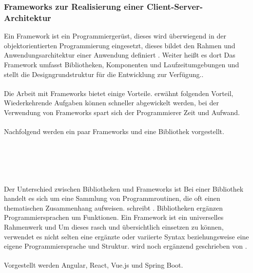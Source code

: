 \subsubsection{Frameworks zur Realisierung einer Client-Server-Architektur}\label{frameworks zur Realisierung einer Client-Server-Architektur}

Ein Framework ist ein Programmiergerüst, dieses wird überwiegend in der objektorientierten Programmierung eingesetzt, dieses bildet den Rahmen und Anwendungsarchitektur einer Anwendung definiert \cite{Framework1}. Weiter heißt es dort \glqq Das Framework umfasst Bibliotheken, Komponenten und Laufzeitumgebungen und stellt die Designgrundstruktur für die Entwicklung zur Verfügung.\grqq{}.
\\
\\
Die Arbeit mit Frameworks bietet einige Vorteile. \cite{Framework2} erwähnt folgenden Vorteil, \glqq Wiederkehrende Aufgaben können schneller abgewickelt werden,\grqq{} bei der Verwendung von Frameworks spart sich der Programmierer Zeit und Aufwand.
\\
\\
Nachfolgend werden ein paar Frameworks und eine Bibliothek vorgestellt. 
\\
\\
\\
\\
\\
\\
Der Unterschied zwischen Bibliotheken und Frameworks ist \glqq Bei einer Bibliothek handelt es sich um eine Sammlung von Programmroutinen, die oft einen thematischen Zusammenhang aufweisen.\grqq{} schreibt \cite{AngularReactVergleich12}. Bibliotheken ergänzen Programmiersprachen um Funktionen. Ein Framework ist ein universelles Rahmenwerk und \glqq Um dieses rasch und übersichtlich einsetzen zu können, verwendet es nicht selten eine ergänzte oder variierte Syntax beziehungsweise eine eigene Programmiersprache und Struktur.\grqq{} wird noch ergänzend geschrieben von \cite{AngularReactVergleich12}. 
\\
\\
Vorgestellt werden Angular, React, Vue.js und Spring Boot. 
\\

